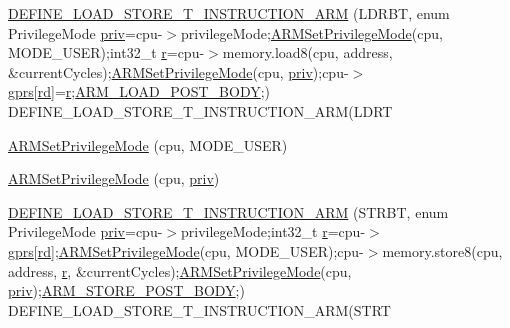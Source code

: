 \begin{DoxyCompactItemize}
\item 
\mbox{\hyperlink{isa-arm_8c_a824564bf7cb568852568a0c815de75c7}{D\+E\+F\+I\+N\+E\+\_\+\+L\+O\+A\+D\+\_\+\+S\+T\+O\+R\+E\+\_\+\+T\+\_\+\+I\+N\+S\+T\+R\+U\+C\+T\+I\+O\+N\+\_\+\+A\+RM}} (L\+D\+R\+BT, enum Privilege\+Mode \mbox{\hyperlink{isa-arm_8c_a0aeea5daab02e6ee74a9948da77a56e5}{priv}}=cpu-\/$>$privilege\+Mode;\mbox{\hyperlink{isa-arm_8c_ac85f42234737e9423c66613a87824701}{A\+R\+M\+Set\+Privilege\+Mode}}(cpu, M\+O\+D\+E\+\_\+\+U\+S\+ER);int32\+\_\+t \mbox{\hyperlink{isa-arm_8c_ad0156306be8fa0a12414e0da384f986a}{r}}=cpu-\/$>$memory.\+load8(cpu, address, \&current\+Cycles);\mbox{\hyperlink{isa-arm_8c_ac85f42234737e9423c66613a87824701}{A\+R\+M\+Set\+Privilege\+Mode}}(cpu, \mbox{\hyperlink{isa-arm_8c_a0aeea5daab02e6ee74a9948da77a56e5}{priv}});cpu-\/$>$\mbox{\hyperlink{isa-thumb_8c_a6b4b7e13a9a144391615b217c5917bc7}{gprs}}\mbox{[}\mbox{\hyperlink{isa-arm_8c_a555541ce18ed9b5fad657a06b22cb465}{rd}}\mbox{]}=\mbox{\hyperlink{isa-arm_8c_ad0156306be8fa0a12414e0da384f986a}{r}};\mbox{\hyperlink{isa-arm_8c_a4131d10dd974fc82650f1680b46fec77}{A\+R\+M\+\_\+\+L\+O\+A\+D\+\_\+\+P\+O\+S\+T\+\_\+\+B\+O\+DY}};) D\+E\+F\+I\+N\+E\+\_\+\+L\+O\+A\+D\+\_\+\+S\+T\+O\+R\+E\+\_\+\+T\+\_\+\+I\+N\+S\+T\+R\+U\+C\+T\+I\+O\+N\+\_\+\+A\+RM(L\+D\+RT
\item 
\mbox{\hyperlink{isa-arm_8c_a4c6e5e11e442b5917745afbab5fd3d5b}{A\+R\+M\+Set\+Privilege\+Mode}} (cpu, M\+O\+D\+E\+\_\+\+U\+S\+ER)
\item 
\mbox{\hyperlink{isa-arm_8c_ac85f42234737e9423c66613a87824701}{A\+R\+M\+Set\+Privilege\+Mode}} (cpu, \mbox{\hyperlink{isa-arm_8c_a0aeea5daab02e6ee74a9948da77a56e5}{priv}})
\item 
\mbox{\hyperlink{isa-arm_8c_a124b1bc37c52993d1f07c82daf4487f8}{D\+E\+F\+I\+N\+E\+\_\+\+L\+O\+A\+D\+\_\+\+S\+T\+O\+R\+E\+\_\+\+T\+\_\+\+I\+N\+S\+T\+R\+U\+C\+T\+I\+O\+N\+\_\+\+A\+RM}} (S\+T\+R\+BT, enum Privilege\+Mode \mbox{\hyperlink{isa-arm_8c_a0aeea5daab02e6ee74a9948da77a56e5}{priv}}=cpu-\/$>$privilege\+Mode;int32\+\_\+t \mbox{\hyperlink{isa-arm_8c_ad0156306be8fa0a12414e0da384f986a}{r}}=cpu-\/$>$\mbox{\hyperlink{isa-thumb_8c_a6b4b7e13a9a144391615b217c5917bc7}{gprs}}\mbox{[}\mbox{\hyperlink{isa-arm_8c_a555541ce18ed9b5fad657a06b22cb465}{rd}}\mbox{]};\mbox{\hyperlink{isa-arm_8c_ac85f42234737e9423c66613a87824701}{A\+R\+M\+Set\+Privilege\+Mode}}(cpu, M\+O\+D\+E\+\_\+\+U\+S\+ER);cpu-\/$>$memory.\+store8(cpu, address, \mbox{\hyperlink{isa-arm_8c_ad0156306be8fa0a12414e0da384f986a}{r}}, \&current\+Cycles);\mbox{\hyperlink{isa-arm_8c_ac85f42234737e9423c66613a87824701}{A\+R\+M\+Set\+Privilege\+Mode}}(cpu, \mbox{\hyperlink{isa-arm_8c_a0aeea5daab02e6ee74a9948da77a56e5}{priv}});\mbox{\hyperlink{isa-arm_8c_ad6ad70baff6f5aa9c5f45e0a59623592}{A\+R\+M\+\_\+\+S\+T\+O\+R\+E\+\_\+\+P\+O\+S\+T\+\_\+\+B\+O\+DY}};) D\+E\+F\+I\+N\+E\+\_\+\+L\+O\+A\+D\+\_\+\+S\+T\+O\+R\+E\+\_\+\+T\+\_\+\+I\+N\+S\+T\+R\+U\+C\+T\+I\+O\+N\+\_\+\+A\+RM(S\+T\+RT

\end{DoxyCompactItemize}
